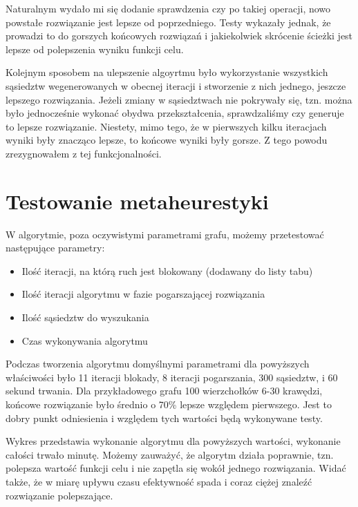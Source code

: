 \documentclass{article}
\begin{document}
\begin{enumerate}
  Naturalnym wydało mi się dodanie sprawdzenia czy po takiej operacji, nowo
  powstałe rozwiązanie jest lepsze od poprzedniego. Testy wykazały jednak, że
  prowadzi to do gorszych końcowych rozwiązań i jakiekolwiek skrócenie ścieżki
  jest lepsze od polepszenia wyniku funkcji celu.

  \vspace{5mm}
  Kolejnym sposobem na ulepszenie algoyrtmu było wykorzystanie wszystkich
  sąsiedztw wegenerowanych w obecnej iteracji i stworzenie z nich jednego,
  jeszcze lepszego rozwiązania. Jeżeli zmiany w sąsiedztwach nie pokrywały się,
  tzn. można było jednocześnie wykonać obydwa przekształcenia, sprawdzaliśmy czy
  generuje to lepsze rozwiązanie. Niestety, mimo tego, że w pierwszych kilku
  iteracjach wyniki były znacząco lepsze, to końcowe wyniki były gorsze. Z tego
  powodu zrezygnowałem z tej funkcjonalności.
\end{enumerate}



\section{Testowanie metaheurestyki}
W algorytmie, poza oczywistymi parametrami grafu, możemy przetestować następujące parametry:
\begin{itemize}
  \item Ilość iteracji, na którą ruch jest blokowany (dodawany do listy tabu)
  \item Ilość iteracji algorytmu w fazie pogarszającej rozwiązania
  \item Ilość sąsiedztw do wyszukania
  \item Czas wykonywania algorytmu
\end{itemize}


Podczas tworzenia algorytmu domyślnymi parametrami dla powyższych właściwości było
11 iteracji blokady, 8 iteracji pogarszania, 300 sąsiedztw, i 60 sekund trwania. 
Dla przykładowego grafu 100 wierzchołków 6-30 krawędzi, końcowe rozwiązanie było
średnio o 70\% lepsze względem pierwszego. Jest to dobry punkt odniesienia i
względem tych wartości będą wykonywane testy.

Wykres przedstawia wykonanie algorytmu dla powyższych wartości, wykonanie
całości trwało minutę. Możemy zauważyć, że algorytm działa poprawnie, tzn.
polepsza wartość funkcji celu i nie zapętla się wokół jednego rozwiązania.
Widać także, że w miarę upływu czasu efektywność spada i coraz ciężej znaleźć
rozwiązanie polepszające.
\end{document}
